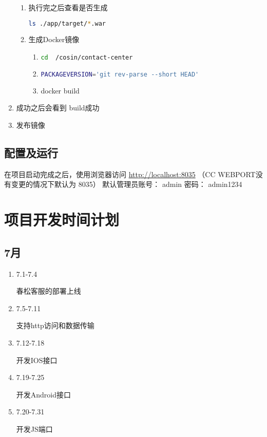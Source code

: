 \documentclass{article}
\newcommand{\tightlist}{
  \setlength{\itemsep}{0pt}
  \setlength{\parskip}{0pt}
}
\begin{document}
\begin{enumerate}
\begin{enumerate}
  \item
    执行完之后查看是否生成
\begin{lstlisting}[language={bash}]
    ls ./app/target/*.war
\end{lstlisting}

  \item
    生成Docker镜像

    \begin{enumerate}
    \tightlist
  \item
    \begin{lstlisting}[language={bash}]
            cd  /cosin/contact-center
\end{lstlisting}

\item
  \begin{lstlisting}[language={bash}]
PACKAGEVERSION='git rev-parse --short HEAD'
\end{lstlisting}

    \item
      docker build
    \end{enumerate}
  \end{enumerate}
\item
  成功之后会看到
  build成功
\item
  发布镜像

\end{enumerate}

\hypertarget{ux914dux7f6eux53caux8fd0ux884c}{%
\subsection{配置及运行}\label{ux914dux7f6eux53caux8fd0ux884c}}



  在项目启动完成之后，使用浏览器访问 \url{http://localhost:8035}
  （CC WEBPORT没有变更的情况下默认为 8035）
  默认管理员账号： admin 密码： admin1234

\hypertarget{ux9879ux76eeux5f00ux53d1ux65f6ux95f4ux8ba1ux5212}{%
\section{项目开发时间计划}\label{ux9879ux76eeux5f00ux53d1ux65f6ux95f4ux8ba1ux5212}}

\hypertarget{ux6708}{%
\subsection{7月}\label{ux6708}}

\begin{enumerate}
\item
  7.1-7.4

  春松客服的部署上线
\item
  7.5-7.11

  支持http访问和数据传输
\item
  7.12-7.18

  开发IOS接口
\item
  7.19-7.25

  开发Android接口
\item
  7.20-7.31

  开发JS端口
\end{enumerate}
\end{document}
